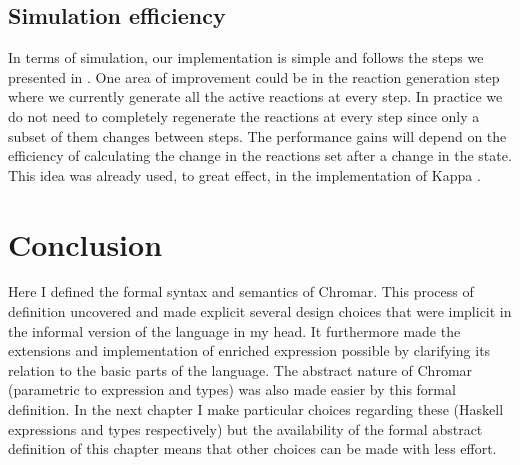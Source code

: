 \subsection{Simulation efficiency}
\label{subsec:simEff}
In terms of simulation, our implementation is simple and follows the steps we
presented in . One area of improvement could be in the reaction
generation step where we currently generate all the active reactions at every
step. In practice we do not need to completely regenerate the reactions at every
step since only a subset of them changes between steps. The performance gains
will depend on the efficiency of calculating the change in the reactions set
after a change in the state. This idea was already used, to great effect, in the
implementation of Kappa \cite{danos_scalable_2007}.


\section{Conclusion}
Here I defined the formal syntax and semantics of Chromar. This process of
definition uncovered and made explicit several design choices that were implicit
in the informal version of the language in my head. It furthermore made the
extensions and implementation of enriched expression possible by clarifying its
relation to the basic parts of the language. The abstract nature of Chromar
(parametric to expression and types) was also made easier by this formal
definition. In the next chapter I make particular choices regarding these
(Haskell expressions and types respectively) but the availability of the formal
abstract definition of this chapter means that other choices can be made with
less effort.


